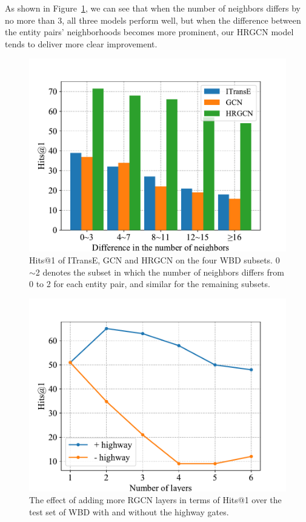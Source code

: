 	As shown in Figure~\ref{subset}, we can see that when the number of neighbors differs by no more than 3, all three models perform well,
	but when the difference between the entity pairs' neighborhoods becomes more prominent,
	our HRGCN model tends to deliver more clear improvement.
	\begin{figure}
	\begin{center}
		\includegraphics[width=1\linewidth]{figures/graph4.pdf}
		\caption{Hits@1 of ITransE, GCN and HRGCN on the four WBD subsets. 0$\sim$2 denotes the subset in which the number of neighbors differs from 0 to 2 for each entity pair, and similar for the remaining subsets.}
		\label{subset}
	\end{center}
\end{figure}
	\begin{figure}
		\begin{center}
			\includegraphics[width=1\linewidth]{figures/graph3.pdf}
			\caption{The effect of adding more RGCN layers in terms of Hits@1 over the test set of WBD with and without the highway gates.}
			\label{highway}
		\end{center}
	\end{figure}
